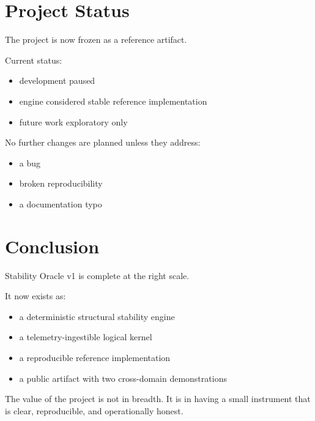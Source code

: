 \documentclass[11pt]{article}
\begin{document}
\section{Project Status}

The project is now frozen as a reference artifact.

Current status:

\begin{itemize}
\item development paused
\item engine considered stable reference implementation
\item future work exploratory only
\end{itemize}

No further changes are planned unless they address:

\begin{itemize}
\item a bug
\item broken reproducibility
\item a documentation typo
\end{itemize}

\section{Conclusion}

Stability Oracle v1 is complete at the right scale.

It now exists as:

\begin{itemize}
\item a deterministic structural stability engine
\item a telemetry-ingestible logical kernel
\item a reproducible reference implementation
\item a public artifact with two cross-domain demonstrations
\end{itemize}

The value of the project is not in breadth.
It is in having a small instrument that is clear, reproducible, and operationally honest.
\end{document}
